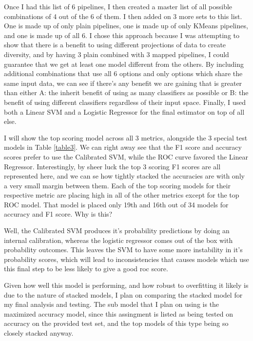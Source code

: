 \documentclass[12pt]{article}
\begin{document}
Once I had this list of 6 pipelines, I then created a master list of all possible combinations of 4 out of the 6 of them. I then added on 
3 more sets to this list. One is made up of only plain pipelines, one is made up of only KMeans pipelines, and one is made up of all 6. I chose 
this approach because I was attempting to show that there is a benefit to using different projections of data to create diversity, and by having 
3 plain combined with 3 mapped pipelines, I could guarantee that we get at least one model different from the others. By including additional 
combinations that use all 6 options and only options which share the same input data, we can see if there's any benefit we are gaining 
that is greater than either A: the inherit benefit of using as many classifiers as possible or B: the benefit of using different classifiers
regardless of their input space. Finally, I used both a Linear SVM and a Logistic Regressor for the final estimator on top of all else.

I will show the top scoring model across all 3 metrics, alongside the 3 special test models in Table \ref{table3}. We can right away see 
that the F1 score and accuracy scores prefer to use the Calibrated SVM, while the ROC curve favored the Linear Regressor. Interestingly,
by sheer luck the top 3 scoring F1 scores are all represented here, and we can se how tightly stacked the accuracies are with only a very small 
margin between them. Each of the top scoring models for their respective metric are placing high in all of the other metrics except for the top 
ROC model. That model is placed only 19th and 16th out of 34 models for accuracy and F1 score. Why is this? 

Well, the Calibrated SVM produces it's probability predictions by doing an internal calibration, whereas the logistic regressor comes out of the 
box with probability outcomes. This leaves the SVM to have some more instability in it's probability scores, which will lead to inconsistencies that 
causes models which use this final step to be less likely to give a good roc score. 

Given how well this model is performing, and how robust to overfitting it likely 
is due to the nature of stacked models, I plan on comparing the stacked model for my final analysis and testing.
The sub model that I plan on using is the maximized accuracy model, since this assingment 
is listed as being tested on accuracy on the provided test set, and the top models of this type being so closely stacked anyway.
\end{document}
